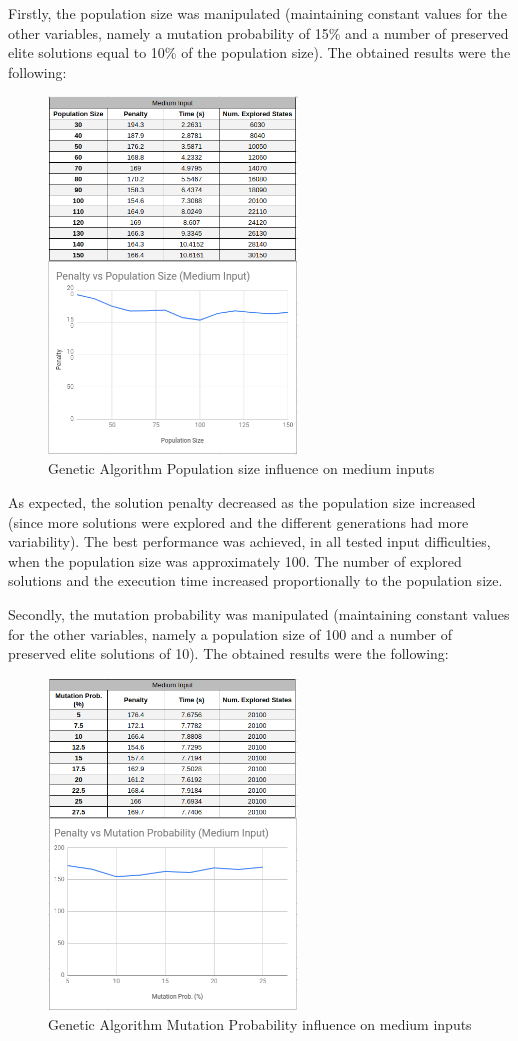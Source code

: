 \documentclass[conference]{IEEEtran}
\begin{document}
Firstly, the population size was manipulated (maintaining constant values for the other variables, namely a mutation probability of 15\% and a number of preserved elite solutions equal to 10\% of the population size). The obtained results were the following: 

\begin{figure}[H]
    \centerline{\includegraphics[width=250px]{genetic_pop_size_medium.png}}
    \caption{Genetic Algorithm Population size influence on medium inputs}
\end{figure}

As expected, the solution penalty decreased as the population size increased (since more solutions were explored and the different generations had more variability). The best performance was achieved, in all tested input difficulties, when the population size was approximately 100. The number of explored solutions and the execution time increased proportionally to the population size. 

Secondly, the mutation probability was manipulated (maintaining constant values for the other variables, namely a population size of 100 and a number of preserved elite solutions of 10). The obtained results were the following: 

\begin{figure}[H]
    \centerline{\includegraphics[width=250px]{mutation_prob_medium.png}}
    \caption{Genetic Algorithm Mutation Probability influence on medium inputs}
\end{figure}
\end{document}
